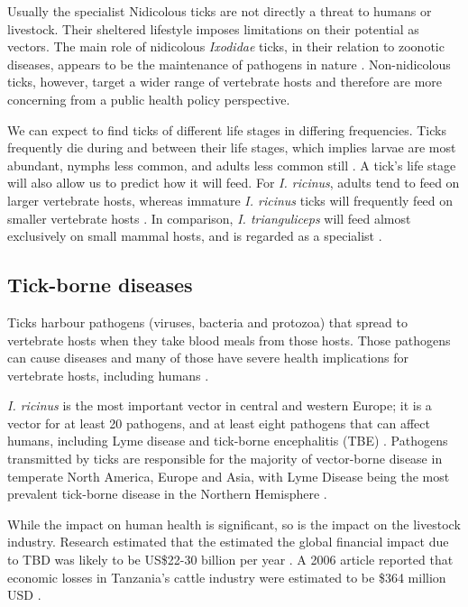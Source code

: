 \documentclass{article}
\begin{document}
Usually the specialist Nidicolous ticks are not directly a threat to humans or livestock. Their sheltered lifestyle imposes limitations on their potential as vectors. The main role of nidicolous \textit{Ixodidae} ticks, in their relation to zoonotic diseases, appears to be the maintenance of pathogens in nature \cite{gray2014}. Non-nidicolous ticks, however, target a wider range of vertebrate hosts and therefore are more concerning from a public health policy perspective.

We can expect to find ticks of different life stages in differing frequencies. Ticks frequently die during and between their life stages, which implies larvae are most abundant, nymphs less common, and adults less common still \cite{Randolph1998}. A tick's life stage will also allow us to predict how it will feed. For \textit{I. ricinus}, adults tend to feed on larger vertebrate hosts, whereas immature \textit{I. ricinus} ticks will frequently feed on smaller vertebrate hosts \cite{Herrmann2015, Randolph1998}. In comparison, \textit{I. trianguliceps} will feed almost exclusively on small mammal hosts, and is regarded as a specialist \cite{Bown2003, Bown2008}.

\subsection{Tick-borne diseases}

Ticks harbour pathogens (viruses, bacteria and protozoa) that spread to vertebrate hosts when they take blood meals from those hosts. Those pathogens can cause diseases and many of those have severe health implications for vertebrate hosts, including humans \cite{Johnson2023e}.

\textit{I. ricinus} is the most important vector in central and western Europe; it is a vector for at least 20 pathogens, and at least eight pathogens that can affect humans, including Lyme disease and tick-borne encephalitis (TBE) \cite{Gray2024}. Pathogens transmitted by ticks are responsible for the majority of vector-borne disease in temperate North America, Europe and Asia, with Lyme Disease being the most prevalent tick-borne disease in the Northern Hemisphere \cite{Rochlin2020}. 

While the impact on human health is significant, so is the impact on the livestock industry. Research estimated that the estimated the global financial impact due to TBD was likely to be US\$22-30 billion per year \cite{Lew_Tabor_2016}. A 2006 article reported that economic losses in Tanzania's cattle industry were estimated to be \$364 million USD \cite{Kivaria2006}.
\end{document}
